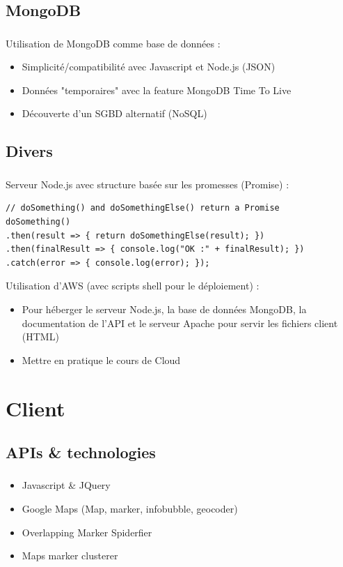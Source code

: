 \documentclass[10pt]{beamer}
\begin{document}
\subsection{MongoDB}
\begin{frame}
	\frametitle{\secname}
	\framesubtitle{\subsecname}
	Utilisation de MongoDB comme base de données :
	\begin{itemize}
		\item Simplicité/compatibilité avec Javascript et Node.js (JSON)
		\item Données "temporaires" avec la feature MongoDB Time To Live
		\item Découverte d'un SGBD alternatif (NoSQL)
	\end{itemize}
\end{frame}

\subsection{Divers}
\begin{frame}[fragile]
	\frametitle{\secname}
	\framesubtitle{\subsecname}
	Serveur Node.js avec structure basée sur les promesses (Promise) :
	\begin{verbatim}
// doSomething() and doSomethingElse() return a Promise
doSomething()
.then(result => { return doSomethingElse(result); })
.then(finalResult => { console.log("OK :" + finalResult); })
.catch(error => { console.log(error); });
	\end{verbatim}
	\bigbreak
	Utilisation d'AWS (avec scripts shell pour le déploiement) :
	\begin{itemize}
		\item Pour héberger le serveur Node.js, la base de données MongoDB,
		la documentation de l'API et le serveur Apache pour servir les fichiers client (HTML)
		\item Mettre en pratique le cours de Cloud
	\end{itemize}
\end{frame}

\section{Client}
\subsection{APIs & technologies}
\begin{frame}
	\frametitle{\secname}
	\begin{itemize}
		\item Javascript & JQuery
		\item Google Maps (Map, marker, infobubble, geocoder)
		\item Overlapping Marker Spiderfier
		\item Maps marker clusterer
	\end{itemize}
\end{frame}
\end{document}

